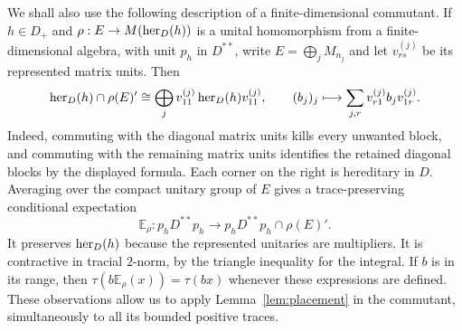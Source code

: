 We shall also use the following description of a finite-dimensional
commutant.  If $h\in D_+$ and
$\rho:E\to M(\operatorname{her}_D(h))$ is a unital homomorphism from a finite-dimensional
algebra, with unit $p_h$ in $D^{**}$, write
$E=\bigoplus_jM_{n_j}$ and let $v^{(j)}_{rs}$ be its represented matrix
units.  Then
\begin{equation}\label{tr:commutant-corners}
 \operatorname{her}_D(h)\cap\rho(E)'
 \cong\bigoplus_j v^{(j)}_{11}\operatorname{her}_D(h)v^{(j)}_{11},\qquad
 (b_j)_j\longmapsto\sum_{j,r}v^{(j)}_{r1}b_jv^{(j)}_{1r}.
\end{equation}
Indeed, commuting with the diagonal matrix units kills every unwanted
block, and commuting with the remaining matrix units identifies the
retained diagonal blocks by the displayed formula.  Each corner on the
right is hereditary in $D$.  Averaging over the compact unitary group
of $E$ gives a trace-preserving conditional expectation
\[
 \mathbb E_\rho:p_hD^{**}p_h\longrightarrow
                  p_hD^{**}p_h\cap\rho(E)'.
\]
It preserves $\operatorname{her}_D(h)$ because the represented unitaries are
multipliers.  It is contractive in tracial $2$-norm, by the triangle
inequality for the integral.  If $b$ is in its range, then
$\tau(b\mathbb E_\rho(x))=\tau(bx)$ whenever these expressions are defined.
These observations allow us to apply Lemma~\ref{lem:placement} in the
commutant, simultaneously to all its bounded positive traces.

